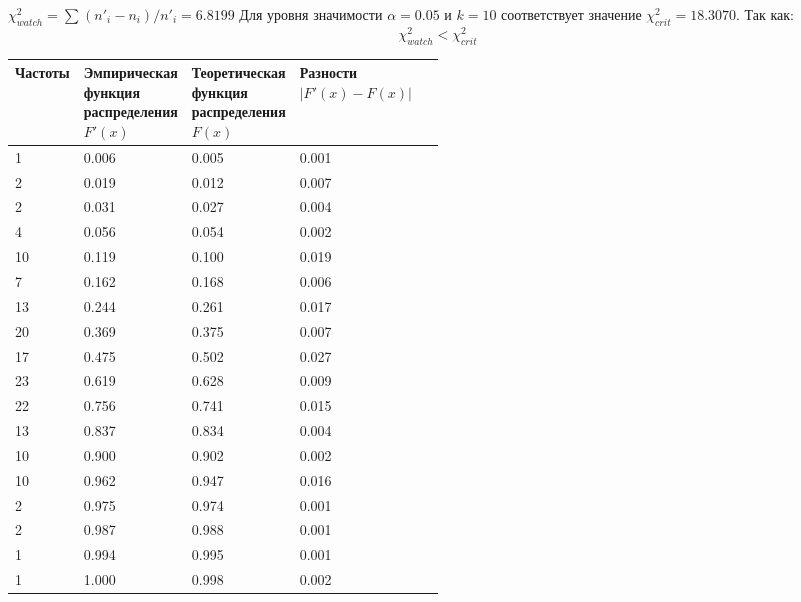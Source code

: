 $\chi^2_{watch} = \sum_{}^{} (n{}'_{i} - n_{i}) / n{}'_{i} = 6.8199$ Для уровня значимости $\alpha = 0.05$ и $k = 10$ соответствует значение $\chi^2_{crit} = 18.3070$.
Так как:
\[\chi^2_{watch} < \chi^2_{crit} \]

\begin{table}[H]
    \begin{center}
        \begin{tabular}{|l|p{0.25\linewidth}|p{0.25\linewidth}|l|}
            \hline
            Частоты & Эмпирическая функция распределения $F{}'(x)$ & Теоретическая функция распределения $F(x)$
            & Разности $\left| F{}'(x) - F(x) \right|$
            \\
            \hline
            1  & 0.006 & 0.005 & 0.001 \\
            \hline
            2  & 0.019 & 0.012 & 0.007 \\
            \hline
            2  & 0.031 & 0.027 & 0.004 \\
            \hline
            4  & 0.056 & 0.054 & 0.002 \\
            \hline
            10 & 0.119 & 0.100 & 0.019 \\
            \hline
            7  & 0.162 & 0.168 & 0.006 \\
            \hline
            13 & 0.244 & 0.261 & 0.017 \\
            \hline
            20 & 0.369 & 0.375 & 0.007 \\
            \hline
            17 & 0.475 & 0.502 & 0.027 \\
            \hline
            23 & 0.619 & 0.628 & 0.009 \\
            \hline
            22 & 0.756 & 0.741 & 0.015 \\
            \hline
            13 & 0.837 & 0.834 & 0.004 \\
            \hline
            10 & 0.900 & 0.902 & 0.002 \\
            \hline
            10 & 0.962 & 0.947 & 0.016 \\
            \hline
            2  & 0.975 & 0.974 & 0.001 \\
            \hline
            2  & 0.987 & 0.988 & 0.001 \\
            \hline
            1  & 0.994 & 0.995 & 0.001 \\
            \hline
            1  & 1.000 & 0.998 & 0.002 \\
            \hline
        \end{tabular}
    \end{center}
\end{table}

